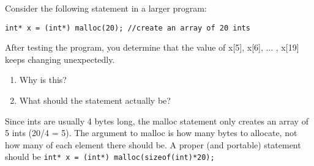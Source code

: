 Consider the following statement in a larger program:

\begin{lstlisting}
int* x = (int*) malloc(20); //create an array of 20 ints
\end{lstlisting}

After testing the program, you determine that the value of x[5], x[6], ... , x[19] keeps changing unexpectedly.
\begin{enumerate}
\item
Why is this?

\item
What should the statement actually be?

\end{enumerate}

\begin{answer}
Since ints are usually 4 bytes long, the malloc statement only creates an array of 5 ints (20/4 = 5).
The argument to malloc is how many bytes to allocate, not how many of each element there should be.
A proper (and portable) statement should be \texttt{int* x = (int*) malloc(sizeof(int)*20);}
\end{answer}
